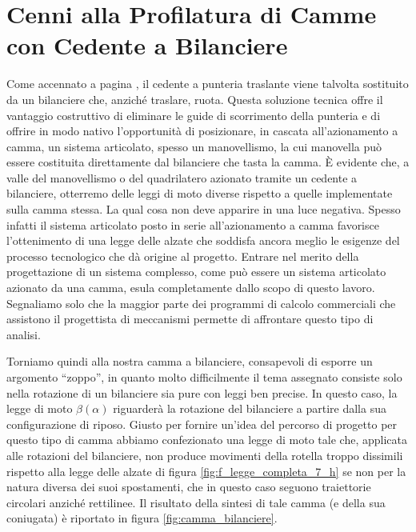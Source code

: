 \section{Cenni alla Profilatura di Camme con Cedente a Bilanciere}

\noindent Come accennato a pagina \pageref{fig:f_cambil}, il cedente
a punteria traslante viene talvolta sostituito
da un bilanciere che, anzich\'e traslare, ruota.
Questa soluzione tecnica offre il vantaggio costruttivo di eliminare 
le guide di scorrimento della punteria e di offrire in modo nativo
l'opportunit\`a di posizionare, in cascata all'azionamento a camma,
un sistema articolato, spesso
un manovellismo, la cui manovella pu\`o essere  costituita direttamente
dal bilanciere che tasta la camma.
\`E evidente che, a valle del manovellismo o del quadrilatero azionato
tramite un cedente a bilanciere, otterremo delle leggi di moto diverse
rispetto a quelle implementate sulla camma stessa.
La qual cosa non deve apparire in una luce negativa. Spesso infatti il
sistema articolato posto in serie all'azionamento a camma favorisce
l'ottenimento di una legge delle alzate che soddisfa ancora meglio le
esigenze del processo tecnologico che d\`a origine al progetto.
Entrare nel merito della progettazione di un sistema complesso, come pu\`o
essere un sistema articolato azionato da una camma, esula completamente
dallo scopo di questo lavoro. Segnaliamo solo che la maggior parte
dei programmi di calcolo commerciali che assistono il progettista di 
meccanismi permette di affrontare questo tipo di analisi.

\noindent Torniamo quindi alla nostra camma a bilanciere,
consapevoli di esporre un argomento ``zoppo'', in quanto molto difficilmente
il tema assegnato consiste solo nella rotazione di un bilanciere sia pure 
con leggi ben precise. 
In questo caso, la legge di moto $\beta(\alpha)$ riguarder\`a la rotazione del
bilanciere a partire dalla sua configurazione di riposo.
Giusto per fornire un'idea del percorso di progetto per questo tipo di camma
abbiamo confezionato una legge di moto tale che, applicata alle rotazioni
del bilanciere, non produce movimenti della rotella troppo dissimili rispetto
alla legge delle alzate di figura \ref{fig:f_legge_completa_7_h}
se non
per la natura diversa dei suoi spostamenti, che in questo
caso seguono traiettorie circolari
anzich\'e rettilinee. Il risultato della sintesi di tale camma (e della sua
coniugata) \`e riportato in figura \ref{fig:camma_bilanciere}.

